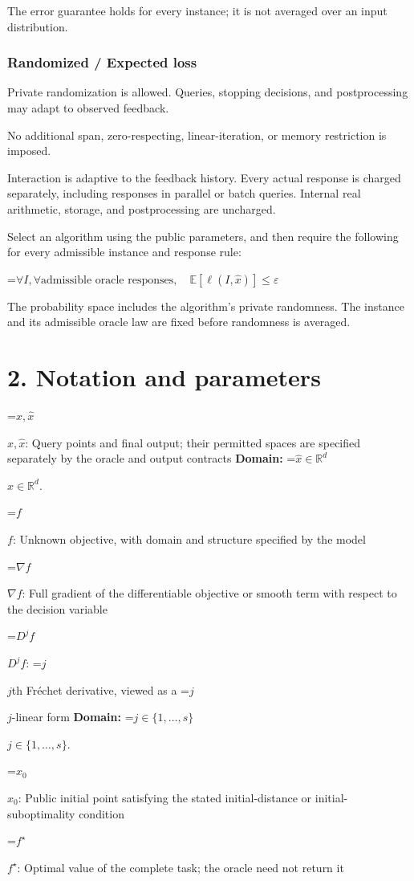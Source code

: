 \documentclass[10pt,a4paper]{article}
\newcommand{\AtlasMath}[1]{\par\begingroup\centering\setbox0=\hbox{$\displaystyle #1$}\ifdim\wd0>1.4\linewidth\typeout{ATLAS WIDE FORMULA: \the\wd0}\fi\ifdim\wd0>\linewidth\resizebox{\linewidth}{!}{\box0}\else\box0\fi\par\endgroup}
\newcommand{\AtlasInlineMath}[1]{\begingroup\setbox0=\hbox{$#1$}\ifdim\wd0>.4\linewidth\endgroup\AtlasMath{#1}\else\endgroup$#1$\fi}
\begin{document}
The error guarantee holds for every instance; it is not averaged over an input distribution.

\subsubsection{Randomized / Expected loss}
Private randomization is allowed. Queries, stopping decisions, and postprocessing may adapt to observed feedback.

No additional span, zero-respecting, linear-iteration, or memory restriction is imposed.

Interaction is adaptive to the feedback history. Every actual response is charged separately, including responses in parallel or batch queries. Internal real arithmetic, storage, and postprocessing are uncharged.

Select an algorithm using the public parameters, and then require the following for every admissible instance and response rule:


\AtlasMath{\forall I,\forall\text{admissible oracle responses},\quad\mathbb{E}[\ell(I,\widehat{x})]\le\varepsilon}


The probability space includes the algorithm's private randomness. The instance and its admissible oracle law are fixed before randomness is averaged.

\section{2. Notation and parameters}
\AtlasInlineMath{x,\widehat{x}}: Query points and final output; their permitted spaces are specified separately by the oracle and output contracts \textbf{Domain:} \AtlasInlineMath{\widehat{x}\in \mathbb{R}^d}.

\AtlasInlineMath{f}: Unknown objective, with domain and structure specified by the model

\AtlasInlineMath{\nabla f}: Full gradient of the differentiable objective or smooth term with respect to the decision variable

\AtlasInlineMath{D^j f}: \AtlasInlineMath{j}th Fréchet derivative, viewed as a \AtlasInlineMath{j}-linear form \textbf{Domain:} \AtlasInlineMath{j\in\{1,\ldots,s\}}.

\AtlasInlineMath{x_0}: Public initial point satisfying the stated initial-distance or initial-suboptimality condition

\AtlasInlineMath{f^\star}: Optimal value of the complete task; the oracle need not return it
\end{document}
